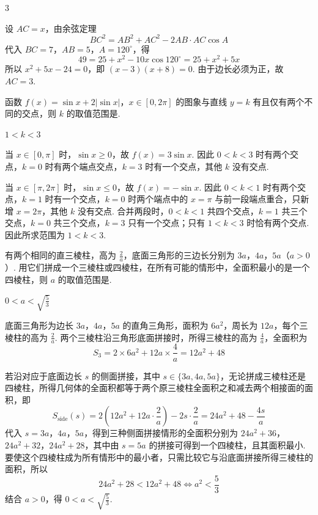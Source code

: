 \begin{answer}
\(3\)
\end{answer}

\begin{solution}
设 \(AC=x\)，由余弦定理
\[
BC^2=AB^2+AC^2-2AB\cdot AC\cos A
\]
代入 \(BC=7\)，\(AB=5\)，\(A=120^{\circ}\)，得
\[
49=25+x^2-10x\cos120^{\circ}=25+x^2+5x
\]
所以 \(x^2+5x-24=0\)，即 \((x-3)(x+8)=0\). 由于边长必须为正，故 \(AC=3\).
\end{solution}

\begin{problem}
函数 \( f(x)=\sin x+2|\sin x| \)，\( x\in[0,2\pi] \) 的图象与直线 \( y=k \) 有且仅有两个不同的交点，则 \( k \) 的取值范围是\fillinblank{}.
\end{problem}

\begin{answer}
\(1<k<3\)
\end{answer}

\begin{solution}
当 \(x\in[0,\pi]\) 时，\(\sin x\geqslant0\)，故 \(f(x)=3\sin x\). 因此 \(0<k<3\) 时有两个交点，\(k=0\) 时有两个端点交点，\(k=3\) 时有一个交点，其他 \(k\) 没有交点.

当 \(x\in[\pi,2\pi]\) 时，\(\sin x\leqslant0\)，故 \(f(x)=-\sin x\). 因此 \(0<k<1\) 时有两个交点，\(k=1\) 时有一个交点，\(k=0\) 时两个端点中的 \(x=\pi\) 与前一段端点重合，只新增 \(x=2\pi\)，其他 \(k\) 没有交点. 合并两段时，\(0<k<1\) 共四个交点，\(k=1\) 共三个交点，\(k=0\) 共三个交点，\(k=3\) 只有一个交点；只有 \(1<k<3\) 时恰有两个交点. 因此所求范围为 \(1<k<3\).
\end{solution}

\begin{problem}
有两个相同的直三棱柱，高为 \(\frac{2}{a}\)，底面三角形的三边长分别为 \(3a\)，\(4a\)，\(5a\)（\(a>0\)）. 用它们拼成一个三棱柱或四棱柱，在所有可能的情形中，全面积最小的是一个四棱柱，则 \(a\) 的取值范围是\fillinblank{}.

\end{problem}

\begin{answer}
\(0<a<\sqrt{\frac{5}{3}}\)
\end{answer}

\begin{solution}
底面三角形为边长 \(3a\)，\(4a\)，\(5a\) 的直角三角形，面积为 \(6a^2\)，周长为 \(12a\)，每个三棱柱的高为 \(\frac2a\). 两个三棱柱沿三角形底面拼接时，所得三棱柱的高为 \(\frac4a\)，全面积为
\[
S_3=2\times6a^2+12a\times\frac4a=12a^2+48
\]

若沿对应于底面边长 \(s\) 的侧面拼接，其中 \(s\in\{3a,4a,5a\}\)，无论拼成三棱柱还是四棱柱，所得几何体的全面积都等于两个原三棱柱全面积之和减去两个相接面的面积，即
\[
S_{\mathrm{side}}(s)=2\left(12a^2+12a\cdot\frac2a\right)-2s\cdot\frac2a=24a^2+48-\frac{4s}{a}
\]
代入 \(s=3a\)，\(4a\)，\(5a\)，得到三种侧面拼接情形的全面积分别为 \(24a^2+36\)，\(24a^2+32\)，\(24a^2+28\)，其中由 \(s=5a\) 的拼接可得到一个四棱柱，且其面积最小. 要使这个四棱柱成为所有情形中的最小者，只需比较它与沿底面拼接所得三棱柱的面积，所以
\[
24a^2+28<12a^2+48\iff a^2<\frac53
\]
结合 \(a>0\)，得 \(0<a<\sqrt{\frac53}\).
\end{solution}

